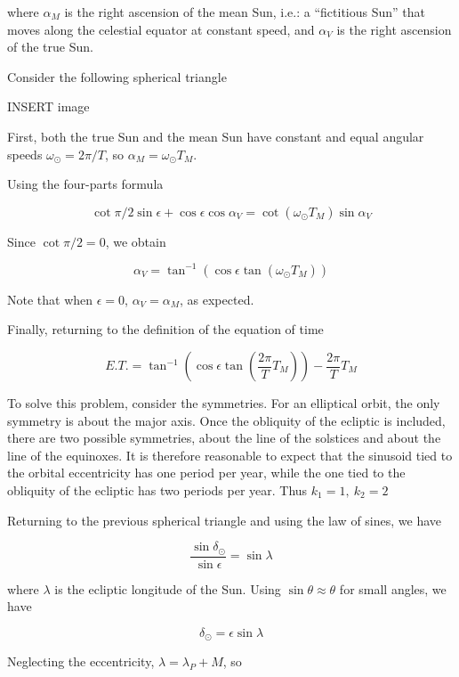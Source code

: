 \documentclass[11pt]{article}
\begin{document}
\begin{pproblem}
\begin{pssolution*}{}{ }
\begin{alternativas}
        where \(\alpha_M\) is the right ascension of the mean Sun, i.e.: a ``fictitious Sun'' that moves along the celestial equator at constant speed, and \(\alpha_V\) is the right ascension of the true Sun.

        Consider the following spherical triangle

        INSERT image

        First, both the true Sun and the mean Sun have constant and equal angular speeds \(\omega_\odot = 2\pi/T\), so \(\alpha_M=\omega_\odot T_M\).

        Using the four-parts formula

        \[\cot \pi/2 \sin\epsilon + \cos\epsilon\cos\alpha_V=\cot(\omega_\odot T_M)\sin\alpha_V\]

        Since \(\cot\pi/2 =0\), we obtain

        \[\alpha_V = \tan^{-1}(\cos\epsilon\tan(\omega_\odot T_M))\]

        Note that when \(\epsilon = 0\), \(\alpha_V = \alpha_M\), as expected.

        Finally, returning to the definition of the equation of time

        \[\boxed{E.T. = \tan^{-1}\left(\cos\epsilon\tan\left(\frac{2\pi}{T} T_M\right)\right) - \frac{2\pi}{T}T_M}\]

        \item To solve this problem, consider the symmetries. For an elliptical orbit, the only symmetry is about the major axis. Once the obliquity of the ecliptic is included, there are two possible symmetries, about the line of the solstices and about the line of the equinoxes. It is therefore reasonable to expect that the sinusoid tied to the orbital eccentricity has one period per year, while the one tied to the obliquity of the ecliptic has two periods per year. Thus \(\boxed{k_1=1, \ k_2 = 2}\)
        
        \item Returning to the previous spherical triangle and using the law of sines, we have
        
        \[\frac{\sin\delta_\odot}{\sin\epsilon} = \sin\lambda\]

        where \(\lambda \) is the ecliptic longitude of the Sun. Using \(\sin\theta \approx \theta\) for small angles, we have

        \[\delta_\odot = \epsilon\sin\lambda\]

        Neglecting the eccentricity, \(\lambda = \lambda_P + M\), so


\end{alternativas}
\end{pssolution*}
\end{pproblem}
\end{document}
